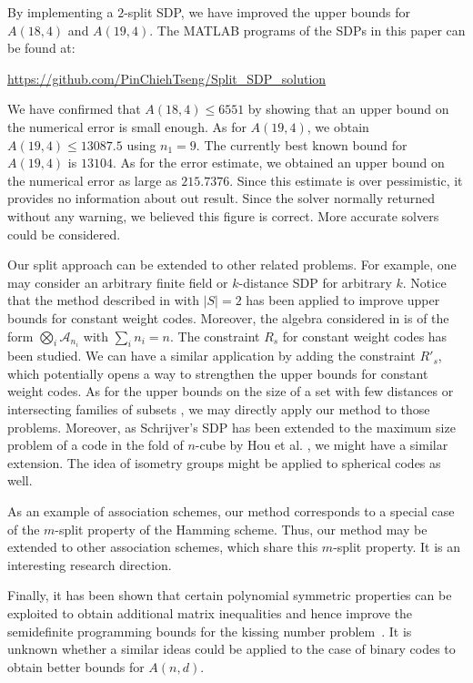 \documentclass[final,onecolumn]{IEEEtran}
\theoremstyle{definition}
\begin{document}
By implementing a $2$-split  SDP, we have improved the upper bounds for $A(18, 4)$ and $A(19, 4)$. 	The MATLAB programs of the SDPs in this paper can be found at: 
\begin{center}
	\url{https://github.com/PinChiehTseng/Split_SDP_solution}
\end{center}
\noindent 	
We have confirmed that $A(18,4)\leq 6551$ by showing that an upper bound on the numerical error is small enough. As for $A(19,4)$, we obtain $A(19,4)\leq 13087.5$  using $n_{1} = 9$.  The currently best known bound for $A(19,4)$ is $13104$.  As for the error estimate,  we obtained an   upper bound on the numerical error as large as   $215.7376$. Since this estimate is over pessimistic, it provides no information about out result. Since the  solver normally returned  without any warning, we believed this figure is correct. More accurate solvers could be considered. 

Our split approach can be extended to other related problems. For example, one may consider an arbitrary finite field or $k$-distance SDP for arbitrary $k$. Notice that the method described in \cite{GMS12} with $\lvert S \rvert = 2$ has been applied to improve upper bounds for constant weight codes. Moreover, the algebra considered in \cite{Pol19_2} is of the form $\bigotimes_{i} \mathcal{A}_{n_{i}}$ with $\sum_{i}n_{i} = n$. The constraint $R_{s}$ for constant weight codes has been studied. We can have a similar application by adding the constraint $R'_{s}$, which potentially opens a way to strengthen the upper bounds for constant weight codes. As for the upper bounds on the size of a set  with few distances or intersecting families of subsets \cite{MN11, BM11}, we may directly apply our method to those problems. Moreover, as Schrijver's SDP has been extended to the maximum size problem of a code in the fold of $n$-cube by Hou et al. \cite{HHGY20}, we might have a similar extension. The idea of isometry groups might be applied to spherical codes as well. 

As an example of association schemes, our method corresponds to a special case of the $m$-split property of the Hamming scheme. Thus, our method may be extended to other association schemes, which share this $m$-split property. It is an interesting research direction.

Finally, it has been shown that certain polynomial symmetric properties can be exploited to obtain additional matrix inequalities and hence improve the  semidefinite programming bounds for the kissing number problem~\cite{caluza2018improving}. It is unknown whether a similar ideas  could be applied to the case of binary codes to obtain better bounds for $A(n,d)$.  
	
\end{document}
